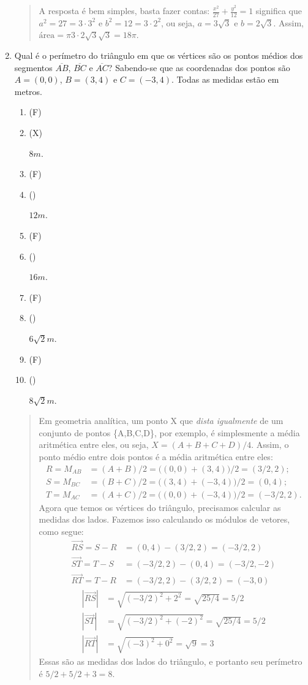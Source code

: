 \documentclass[12pt,a4paper]{article}
\newenvironment{ans}{\color{blue}\begin{quote}}{\end{quote}}
\newif \ifans
\newif \ifvf
\newcommand{\alt}{
	\ifvf
		\ifans
			\item({\sf\color{ForestGreen}V})
		\else 
			\item({\sf\color{Orange}F}) 
		\fi
	\else
		\ifans
			\item({\sf\color{Cyan}X})
		\else 
			\item({\sf\phantom{X}}) 
		\fi	
	\fi	
	\ansfalse
	\vffalse
}
\def\X{\anstrue}
\begin{document}
\begin{enumerate}
	\begin{ans}
	A resposta é bem simples, basta fazer contas: $\tfrac{x^2}{27}+\tfrac{y^2}{12}=1$ significa que $a^2=27=3 \cdot 3^2$ e $b^2=12=3\cdot 2^2$, ou seja, $a=3\sqrt{3}$ e $b=2\sqrt{3}$. Assim,  $\text{área}=\pi3\cdot2\sqrt{3}\sqrt{3}=18\pi$.
	\end{ans}








\item Qual é o perímetro do triângulo em que os vértices são os pontos médios dos segmentos $\overline{AB}$, $\overline{BC}$ e $\overline{AC}$? Sabendo-se que as coordenadas dos pontos são $A=(0,0)$, $B=(3,4)$ e $C=(-3,4)$. Todas as medidas estão em metros.
	\begin{enumerate}
	\X\alt $8m$. 
	\alt $12m$.
	\alt $16m$.
	\alt $6\sqrt{2}m$.
	\alt $8\sqrt{2}m$.
	\end{enumerate}
	
	
	\begin{ans}
	Em geometria analítica, um ponto X que \emph{dista igualmente} de um conjunto de pontos \{A,B,C,D\}, por exemplo, é simplesmente a média aritmética entre eles, ou seja, $X=(A+B+C+D)/4$. Assim, o ponto médio entre dois pontos é a média aritmética entre eles: 
\[
\begin{aligned}
R=M_{AB}&=(A+B)/2=\big((0,0)+(3,4)\big)/2=(3/2,2);\\
S=M_{BC}&=(B+C)/2=\big((3,4)+(-3,4)\big)/2=(0,4);\\
T=M_{AC}&=(A+C)/2=\big((0,0)+(-3,4)\big)/2=(-3/2,2).
\end{aligned}
\]
	Agora que temos os vértices do triângulo, precisamos calcular as medidas dos lados. Fazemos isso calculando os módulos de vetores, como segue:
\[
	\begin{aligned}
		\overrightarrow{RS} = S-R &= (0,4)-(3/2,2) = (-3/2,2)\\
		\overrightarrow{ST} = T-S &= (-3/2,2) - (0,4) = (-3/2,-2)\\
		\overrightarrow{RT} = T-R &= (-3/2,2) - (3/2,2) = (-3,0)
	\end{aligned}
\]
\[
	\begin{aligned}
		\left|\overrightarrow{RS}\right| &= \sqrt{(-3/2)^2+2^2}=\sqrt{25/4}=5/2\\
		\left|\overrightarrow{ST}\right| &= \sqrt{(-3/2)^2+(-2)^2}=\sqrt{25/4}=5/2\\
		\left|\overrightarrow{RT}\right| &= \sqrt{(-3)^2+0^2}=\sqrt{9}=3
	\end{aligned}
\]
	Essas são as medidas dos lados do triângulo, e portanto seu perímetro é $5/2+5/2+3=8$.
	\end{ans}










\end{enumerate}
\end{document}
